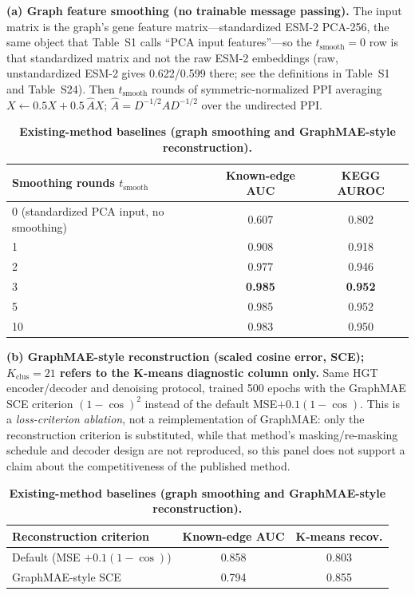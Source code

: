 \documentclass[11pt,a4paper]{article}
\begin{document}
\begin{table}[h]
\centering
\caption{\textbf{Existing-method baselines (graph smoothing and GraphMAE-style reconstruction).}}
\label{tab:s21}
\footnotesize
\textbf{(a) Graph feature smoothing (no trainable message passing).} The input matrix is the graph's gene feature matrix---standardized ESM-2 PCA-256, the same object that Table~S1 calls ``PCA input features''---so the $t_{\text{smooth}}=0$ row is that standardized matrix and not the raw ESM-2 embeddings (raw, unstandardized ESM-2 gives 0.622/0.599 there; see the definitions in Table~S1 and Table~S24). Then $t_{\text{smooth}}$ rounds of
symmetric-normalized PPI averaging $X \leftarrow 0.5X + 0.5\,\hat{A}X$; $\hat{A} = D^{-1/2}AD^{-1/2}$ over the undirected PPI.
\begin{tabular}{@{}lcc@{}}
\toprule
\textbf{Smoothing rounds $t_{\text{smooth}}$} & \textbf{Known-edge AUC} & \textbf{KEGG AUROC} \\
\midrule
0 (standardized PCA input, no smoothing) & 0.607 & 0.802 \\
1 & 0.908 & 0.918 \\
2 & 0.977 & 0.946 \\
3 & \textbf{0.985} & \textbf{0.952} \\
5 & 0.985 & 0.952 \\
10 & 0.983 & 0.950 \\
\bottomrule
\end{tabular}

\smallskip
\textbf{(b) GraphMAE-style reconstruction (scaled cosine error, SCE); $K_{\text{clus}}=21$ refers to the K-means diagnostic column only.} Same HGT encoder/decoder and denoising protocol,
trained 500 epochs with the GraphMAE SCE criterion $(1-\cos)^2$ instead of the default MSE$+0.1(1-\cos)$. This is a
\emph{loss-criterion ablation}, not a reimplementation of GraphMAE: only the reconstruction criterion is substituted, while
that method's masking/re-masking schedule and decoder design are not reproduced, so this panel does not support a claim
about the competitiveness of the published method.
\begin{tabular}{@{}lcc@{}}
\toprule
\textbf{Reconstruction criterion} & \textbf{Known-edge AUC} & \textbf{K-means recov.} \\
\midrule
Default (MSE $+0.1(1-\cos)$) & 0.858 & 0.803 \\
GraphMAE-style SCE & 0.794 & 0.855 \\
\bottomrule
\end{tabular}





\end{table}
\end{document}
